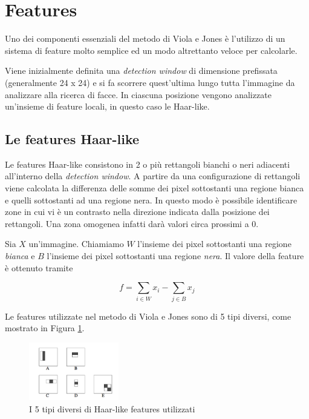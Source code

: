 \section{Features}

Uno dei componenti essenziali del metodo di Viola e Jones è l'utilizzo di un sistema di feature molto semplice ed un modo altrettanto veloce per calcolarle.

Viene inizialmente definita una \emph{detection window} di dimensione prefissata (generalmente 24 x 24) e si fa scorrere quest'ultima lungo tutta l'immagine da analizzare alla ricerca di facce. In ciascuna posizione vengono analizzate un'insieme di feature locali, in questo caso le Haar-like.

\subsection{Le features Haar-like}

Le features Haar-like consistono in 2 o più rettangoli bianchi o neri adiacenti all'interno della \emph{detection window}. A partire da una configurazione di rettangoli viene calcolata la differenza delle somme dei pixel sottostanti una regione bianca e quelli sottostanti ad una regione nera. In questo modo è possibile identificare zone in cui vi è un contrasto nella direzione indicata dalla posizione dei rettangoli. Una zona omogenea infatti darà valori circa prossimi a 0.

Sia $X$ un'immagine. Chiamiamo $W$ l'insieme dei pixel sottostanti una regione \textit{bianca} e $B$ l'insieme dei pixel sottostanti una regione \textit{nera}. Il valore della feature è ottenuto tramite

$$
f = \sum_{i \in W} x_i - \sum_{j \in B} x_j
$$

Le features utilizzate nel metodo di Viola e Jones sono di 5 tipi diversi, come mostrato in Figura \ref{fig:haar}.

\begin{figure}[h]
\begin{center}
\includegraphics[width=0.35\textwidth]{images/haar}
\end{center}
  \caption{I 5 tipi diversi di Haar-like features utilizzati}
\label{fig:haar}
\end{figure}

